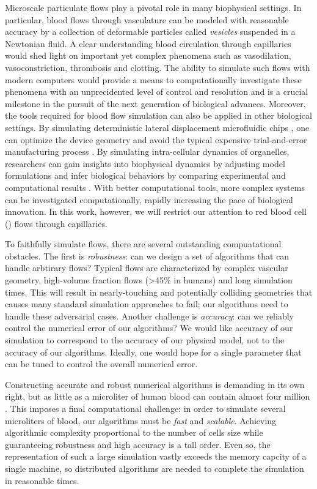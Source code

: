 
Microscale particulate flows play a pivotal role in many biophysical settings.
In particular, blood flows through vasculature can be modeled with reasonable accuracy by a collection of deformable particles called \textit{vesicles} suspended in a Newtonian fluid.
A clear understanding blood circulation through capillaries would shed light on important yet complex phenomena such as vasodilation, vasoconstriction, thrombosis and clotting.
The ability to simulate such flows with modern computers would provide a means to computationally investigate these phenomena with an unprecidented level of control and resolution and is a crucial milestone in the pursuit of the next generation of biological advances.
Moreover, the tools required for blood flow simulation can also be applied in other biological settings.
By simulating deterministic lateral displacement microfluidic chips , one can optimize the device geometry and avoid the typical expensive trial-and-error manufacturing process \cite{kabacaouglu2019sorting}.
By simulating intra-cellular dynamics of organelles, researchers can gain insights into biophysical dynamics by adjusting model formulations and infer biological behaviors by comparing experimental and computational results \cite{nazockdast2017cytoplasmic}. 
With better computational tools, more complex systems can be investigated computationally, rapidly increasing the pace of biological innovation.
In this work, however, we will restrict our attention to red blood cell (\rbc) flows through capillaries.

To faithfully simulate \rbc flows, there are several outstanding compuatational obstacles.
The first is \textit{robustness}: can we design a set of algorithms that can handle arbtirary flows?
Typical flows are characterized by complex vascular geometry, high-volume fraction flows (>45\% in humans) and long simulation times. 
This will result in nearly-touching and potentially colliding geometries that causes many standard simulation approaches to fail; our algorithms need to handle these adversarial cases.
Another challenge is \textit{accuracy}: can we reliably control the numerical error of our algorithms?
We would like accuracy of our simulation to correspond to the accuracy of our physical model, not to the accuracy of our algorithms.
Ideally, one would hope for a single parameter that can be tuned to control the overall numerical error.

Constructing accurate and robust numerical algorithms is demanding in its own right, but as little as a microliter of human blood can contain almost four million \rbcs.
This imposes a final computational challenge: in order to simulate several microliters of blood, our algorithms must be \textit{fast} and \textit{scalable}.
Achieving algorithmic complexity proportional to the number of cells size while guaranteeing robustness and high accuracy is a tall order.
Even so, the representation of such a large simulation vastly exceeds the memory capcity of a single machine, so distributed algorithms are needed to complete the simulation in reasonable times.

